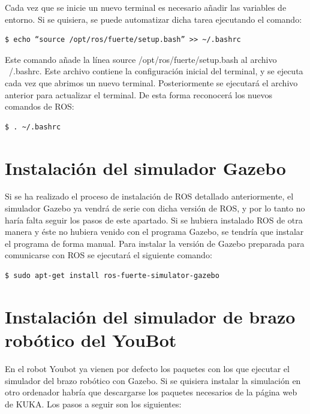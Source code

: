 \documentclass[12pt, a4paper]{report}
\begin{document}
Cada vez que se inicie un nuevo terminal es necesario añadir las variables de entorno. Si se quisiera, se puede automatizar dicha tarea ejecutando el comando:

\begin{verbatim}
$ echo “source /opt/ros/fuerte/setup.bash” >> ~/.bashrc
\end{verbatim}

Este comando añade la línea source /opt/ros/fuerte/setup.bash al archivo ~/.bashrc. Este archivo contiene la configuración inicial del terminal, y se ejecuta cada vez que abrimos un nuevo terminal. Posteriormente se ejecutará el archivo anterior para actualizar el terminal. De esta forma reconocerá los nuevos comandos de ROS:

\begin{verbatim}
$ . ~/.bashrc
\end{verbatim}

\section{Instalación del simulador Gazebo}

Si se ha realizado el proceso de instalación de ROS detallado anteriormente, el simulador Gazebo ya vendrá de serie con dicha versión de ROS, y por lo tanto no haría falta seguir los pasos de este apartado. Si se hubiera instalado ROS de otra manera y éste no hubiera venido con el programa Gazebo, se tendría que instalar el programa de forma manual. Para instalar la versión de Gazebo preparada para comunicarse con ROS se ejecutará el siguiente comando:

\begin{verbatim}
$ sudo apt-get install ros-fuerte-simulator-gazebo
\end{verbatim}

\section{Instalación del simulador de brazo robótico del YouBot}

En el robot Youbot ya vienen por defecto los paquetes con los que ejecutar el simulador del brazo robótico con Gazebo. Si se quisiera instalar la simulación en otro ordenador habría que descargarse los paquetes necesarios de la página web de KUKA. Los pasos a seguir son los siguientes:
\end{document}
